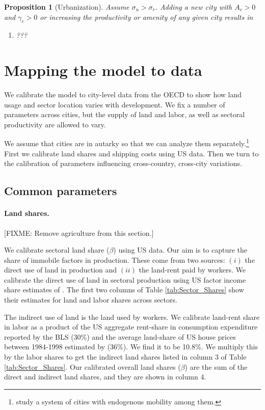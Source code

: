 \documentclass[12pt]{article}
\newtheorem{proposition}{Proposition}
\begin{document}
\begin{proposition}[Urbanization]\label{prop:city}
Assume $\sigma_u>\sigma_r$. Adding a new city with $A_c>0$ and $\gamma_c>0$ or increasing the productivity or amenity of any given city results in
\begin{enumerate}
	\item ???
\end{enumerate}
\end{proposition}

\section{Mapping the model to data}
We calibrate the model to city-level data from the OECD to show how land usage and sector location varies with development. We fix a number of parameters across cities, but the supply of land and labor, as well as sectoral productivity are allowed to vary.

We assume that cities are in autarky so that we can analyze them separately.\footnote{ study a system of cities with endogenous mobility among them.} First we calibrate land shares and shipping costs using US data. Then we turn to the calibration of parameters influencing cross-country, cross-city variations.

\subsection{Common parameters}
\paragraph{Land shares.}
[FIXME: Remove agriculture from this section.]

We calibrate sectoral land share ($\beta$) using US data. Our aim is to capture the share of immobile factors in production. These come from two sources: $(i)$ the direct use of land in production and $(ii)$ the land-rent paid by workers. We calibrate the direct use of land in sectoral production using US factor income share estimates of . The first two columns of Table \ref{tab:Sector_Shares} show their estimates for land and labor shares across sectors.

The indirect use of land is the land used by workers. We calibrate land-rent share in labor as a product of the US aggregate rent-share in consumption expenditure reported by the BLS ($30\%$) and the average land-share of US house prices between 1984-1998 estimated by  (36\%). We find it to be 10.8\%. We multiply this by the labor shares to get the indirect land shares listed in column 3 of Table \ref{tab:Sector_Shares}. Our calibrated overall land shares ($\beta$) are the sum of the direct and indirect land shares, and they are shown in column 4.
\end{document}
